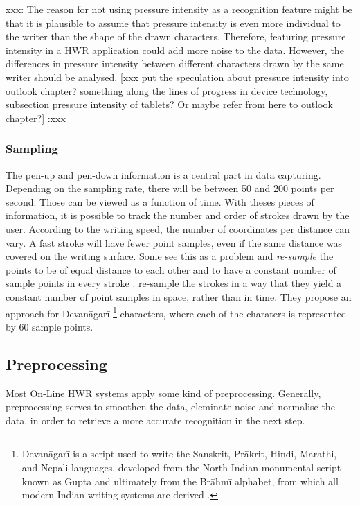 xxx: 
The reason for not using pressure intensity as a recognition feature might be 
that it is plausible to assume that pressure intensity is even more individual 
to the writer than the shape of the drawn characters. 
Therefore, featuring pressure intensity in a HWR application could add more 
noise to the data. However, the differences in pressure intensity 
between different characters drawn by the same writer should be analysed.
[xxx put the speculation about pressure intensity into outlook chapter? 
something along the lines of progress in device technology, 
subsection pressure intensity of tablets? Or maybe refer from here to
outlook chapter?] 
:xxx

\subsubsection{Sampling}
\label{sec:sampling}

The pen-up and pen-down information is a central part in data capturing. 
Depending on the sampling rate, there will be between 50 and 200 points per 
second. Those can be viewed as a function of time.
With theses pieces of information, it is possible to track the number and order
of strokes drawn by the user. According to the writing speed, the number of 
coordinates per distance can vary. A fast stroke will have fewer point samples,
even if the same distance was covered on the writing surface.
Some see this as a problem and \emph{re-sample} the points to be of equal 
distance to each other and to have a constant number of sample points in every 
stroke .
 re-sample the strokes in a way that they yield a constant 
number of point samples in space, rather than in time. They propose an approach 
for Devanāgarī
\footnote 
{
Devanāgarī is a script used to write the Sanskrit, Prākrit, Hindi, Marathi, 
and Nepali languages, developed from the North Indian monumental script known 
as Gupta and ultimately from the Brāhmī alphabet, from which all modern Indian 
writing systems are derived \cite{EncyclopediaBritannicaDevanagari}.
} 
characters, where each of the charaters is represented by 60 sample points.

\subsection{Preprocessing}
\label{sec:preprocessing}

Most On-Line HWR systems apply some kind of preprocessing. Generally, 
preprocessing serves to smoothen the data, eleminate noise and normalise the
data, in order to retrieve a more accurate recognition in the next step.


